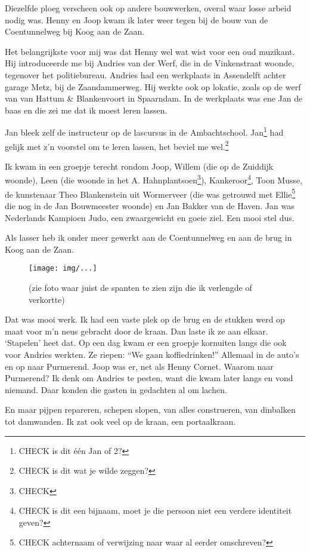 \documentclass[10pt,twoside,openright]{memoir}
\begin{document}
Diezelfde ploeg verscheen ook op andere bouwwerken, overal waar losse arbeid nodig was. Henny en Joop kwam ik later weer tegen bij de bouw van de Coentunnelweg bij Koog aan de Zaan. 

Het belangrijkste voor mij was dat Henny wel wat wist voor een oud muzikant. Hij introduceerde me bij Andries van der Werf, die in de Vinkenstraat woonde, tegenover het politiebureau. Andries had een werkplaats in Assendelft achter garage Metz, bij de Zaandammerweg. Hij werkte ook op lokatie, zoals op de werf van van Hattum \& Blankenvoort in Spaarndam. In de werkplaats was ene Jan de baas en die zei me dat ik moest leren lassen. 

Jan bleek zelf de instructeur op de lascursus in de Ambachtschool. Jan\footnote{CHECK is dit één Jan of 2?} had gelijk met z’n voorstel om te leren lassen, het beviel me wel.\footnote{CHECK is dit wat je wilde zeggen?}

Ik kwam in een groepje terecht rondom Joop, Willem (die op de Zuiddijk woonde), Leen (die woonde in het A. Hahnplantsoen\footnote{CHECK}), Kankeroor\footnote{CHECK is dit een bijnaam, moet je die persoon niet een verdere identiteit geven?}, Toon Musse, de kunstenaar Theo Blankenstein uit Wormerveer (die was  getrouwd met Ellie\footnote{CHECK achternaam of verwijzing naar waar al eerder omschreven?} die nog in de Jan Bouwmeester woonde) en Jan Bakker van de Haven. Jan was Nederlands Kampioen Judo, een zwaargewicht en goeie ziel. Een mooi stel dus.

Als lasser heb ik onder meer gewerkt aan de Coentunnelweg en aan de brug in Koog aan de Zaan. 

\begin{figure}[t]
\texttt{[image: img/...]}
\caption{(zie foto waar juist de spanten te zien zijn die ik verlengde of verkortte)}
\end{figure}

Dat was mooi werk. Ik had een vaste plek op de brug en de stukken werd op maat voor m’n neus gebracht door de kraan. Dan laste ik ze aan elkaar. `Stapelen' heet dat. Op een dag kwam er een groepje kornuiten langs die ook voor Andries werkten. Ze riepen: ``We gaan koffiedrinken!'' Allemaal in de auto’s en op naar Purmerend. Joop was er, net als Henny Cornet. Waarom naar Purmerend? Ik denk om Andries te pesten, want die kwam later langs en vond niemand. Daar konden die gasten in gedachten al om lachen.

En maar pijpen repareren, schepen slopen, van alles construeren, van dinbalken tot damwanden. Ik zat ook veel op de kraan, een portaalkraan. 
\end{document}
